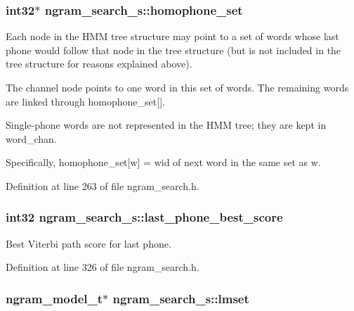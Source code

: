 \subsubsection[{homophone\+\_\+set}]{\setlength{\rightskip}{0pt plus 5cm}int32$\ast$ ngram\+\_\+search\+\_\+s\+::homophone\+\_\+set}\label{structngram__search__s_ab251bb3d0ddd33dd99ed390b61e481f2}


Each node in the H\+M\+M tree structure may point to a set of words whose last phone would follow that node in the tree structure (but is not included in the tree structure for reasons explained above). 

The channel node points to one word in this set of words. The remaining words are linked through homophone\+\_\+set[].

Single-\/phone words are not represented in the H\+M\+M tree; they are kept in word\+\_\+chan.

Specifically, homophone\+\_\+set[w] = wid of next word in the same set as w. 

Definition at line 263 of file ngram\+\_\+search.\+h.

\subsubsection[{last\+\_\+phone\+\_\+best\+\_\+score}]{\setlength{\rightskip}{0pt plus 5cm}int32 ngram\+\_\+search\+\_\+s\+::last\+\_\+phone\+\_\+best\+\_\+score}\label{structngram__search__s_a81ee45f3c184568e2b5f8b79c58e0b9e}


Best Viterbi path score for last phone. 



Definition at line 326 of file ngram\+\_\+search.\+h.

\subsubsection[{lmset}]{\setlength{\rightskip}{0pt plus 5cm}ngram\+\_\+model\+\_\+t$\ast$ ngram\+\_\+search\+\_\+s\+::lmset}\label{structngram__search__s_a6127a6d8fb53832e67456c11aa6ad9c4}


